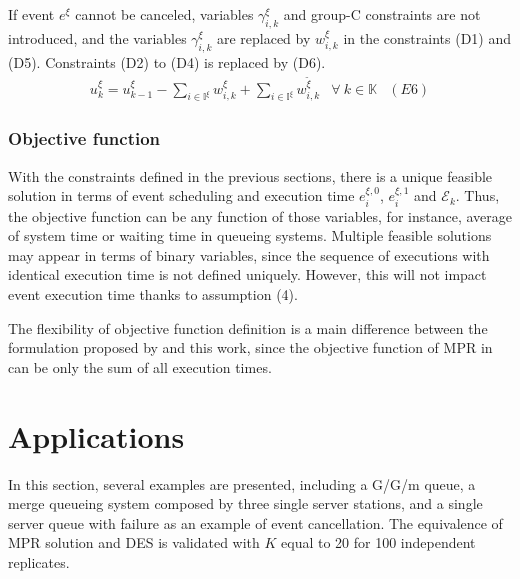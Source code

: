 \documentclass[]{interact}
\theoremstyle{plain}%
\theoremstyle{definition}
\theoremstyle{remark}
\begin{document}
 If event $e^{\xi}$ cannot be canceled, variables $\gamma^{\xi}_{i,k}$ and group-C constraints are not introduced, and the variables $\gamma^{\xi}_{i,k}$ are replaced by $w^{\xi}_{i,k}$ in the constraints (D1) and (D5). Constraints (D2) to (D4) is replaced by (D6).
 \begin{eqnarray}
 u^{\xi}_{k}= u^{\xi}_{k-1} - \sum_{i\in \mathbb{I}^{\xi}} w^{\xi}_{i,k} + \sum_{i\in \mathbb{I}^{\xi}} w^{\tilde{\xi}}_{i,k} & \forall\ k\in \mathbb{K}&(E6)\nonumber
 \end{eqnarray}
 
 
\subsubsection{Objective function}\label{sec:obj}
With the constraints defined in the previous sections, there is a unique feasible solution in terms of event scheduling and execution time $e^{\xi,0}_i$, $e^{\xi,1}_{i}$ and $\mathcal{E}_k$. Thus, the objective function can be any function of those variables, for instance, average of system time or waiting time in queueing systems. Multiple feasible solutions may appear in terms of binary variables, since the sequence of executions with identical execution time is not defined uniquely. However, this will not impact event execution time thanks to assumption (4).

The flexibility of objective function definition is a main difference between the formulation proposed by \cite{chan2008optimization} and this work, since the objective function of MPR in \cite{chan2008optimization} can be only the sum of all execution times.

\section{Applications}\label{sec:app}

In this section, several examples are presented, including a G/G/m queue, a merge queueing system composed by three single server stations, and a single server queue with failure as an example of event cancellation. The equivalence of MPR solution and DES is validated with $K$ equal to 20 for 100 independent replicates. 
\end{document}
